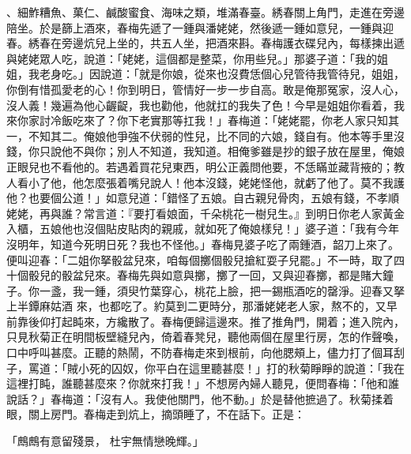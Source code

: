、細鮓糟魚、菓仁、鹹酸蜜食、海味之類，堆滿春臺。綉春關上角門，走進在旁邊陪坐。於是篩上酒來，春梅先遞了一鍾與潘姥姥，然後遞一鍾如意兒，一鍾與迎春。綉春在旁邊炕兒上坐的，共五人坐，把酒來斟。春梅護衣碟兒內，每樣揀出遞與姥姥眾人吃，說道：「姥姥，這個都是整菜，你用些兒。」那婆子道：「我的姐姐，我老身吃。」因說道：「就是你娘，從來也沒費恁個心兒管待我管待兒，姐姐，你倒有惜孤愛老的心！你到明日，管情好一步一步自高。敢是俺那冤家，沒人心，沒人義！幾遍為他心齷齪，我也勸他，他就扛的我失了色！今早是姐姐你看着，我來你家討冷飯吃來了？你下老實那等扛我！」春梅道：「姥姥罷，你老人家只知其一，不知其二。俺娘他爭強不伏弱的性兒，比不同的六娘，錢自有。他本等手里沒錢，你只說他不與你；別人不知道，我知道。相俺爹雖是抄的銀子放在屋里，俺娘正眼兒也不看他的。若遇着買花兒東西，明公正義問他要，不恁瞞並藏背掖的；教人看小了他，他怎麼張着嘴兒說人！他本沒錢，姥姥怪他，就虧了他了。莫不我護他？也要個公道！」如意兒道：「錯怪了五娘。自古親兒骨肉，五娘有錢，不孝順姥姥，再與誰？常言道：『要打看娘面，千朵桃花一樹兒生。』到明日你老人家黃金入櫃，五娘他也沒個貼皮貼肉的親戚，就如死了俺娘樣兒！」婆子道：「我有今年沒明年，知道今死明日死？我也不怪他。」春梅見婆子吃了兩鍾酒，韶刀上來了。便叫迎春：「二姐你拏骰盆兒來，咱每個擲個骰兒搶紅耍子兒罷。」不一時，取了四十個骰兒的骰盆兒來。春梅先與如意與擲，擲了一回，又與迎春擲，都是賭大鐘子。你一盞，我一鍾，須臾竹葉穿心，桃花上臉，把一錫瓶酒吃的罄淨。迎春又拏上半鐔麻姑酒 來，也都吃了。約莫到二更時分，那潘姥姥老人家，熬不的，又早前靠後仰打起盹來，方纔散了。春梅便歸這邊來。推了推角門，開着；進入院內，只見秋菊正在明間板壁縫兒內，倚着春凳兒，聽他兩個在屋里行房，怎的作聲喚，口中呼叫甚麼。正聽的熱鬧，不防春梅走來到根前，向他腮頰上，儘力打了個耳刮子，罵道：「賊小死的囚奴，你平白在這里聽甚麼！」打的秋菊睜睜的說道：「我在這裡打盹，誰聽甚麼來？你就來打我！」不想房內婦人聽見，便問春梅：「他和誰說話？」春梅道：「沒有人。我使他關門，他不動。」於是替他摭過了。秋菊揉着眼，關上房門。春梅走到炕上，摘頭睡了，不在話下。正是：

「鷓鷓有意留殘景，  杜宇無情戀晚輝。」

